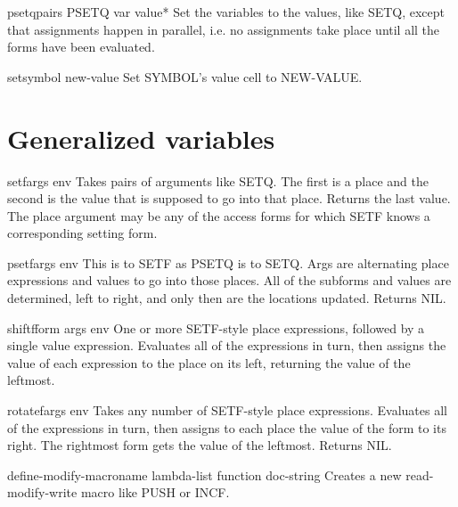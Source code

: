 \documentclass[10pt,english]{book}
\begin{document}
\begin{macro}{psetq}{\rest pairs}
  PSETQ {var value}*
   Set the variables to the values, like SETQ, except that assignments
   happen in parallel, i.e. no assignments take place until all the
   forms have been evaluated.
\end{macro}

\begin{function}{set}{symbol new-value}
  Set SYMBOL's value cell to NEW-VALUE.
\end{function}

\section{Generalized variables}
\label{sec:gener-vari}

\begin{macro}{setf}{\rest args \env env}
  Takes pairs of arguments like SETQ. The first is a place and the second
  is the value that is supposed to go into that place. Returns the last
  value. The place argument may be any of the access forms for which SETF
  knows a corresponding setting form.
\end{macro}

\begin{macro}{psetf}{\rest args \env env}
  This is to SETF as PSETQ is to SETQ. Args are alternating place
  expressions and values to go into those places. All of the subforms and
  values are determined, left to right, and only then are the locations
  updated. Returns NIL.
\end{macro}

\begin{macro}{shiftf}{\whole form \rest args \env env}
  One or more SETF-style place expressions, followed by a single
   value expression. Evaluates all of the expressions in turn, then
   assigns the value of each expression to the place on its left,
   returning the value of the leftmost.
\end{macro}

\begin{macro}{rotatef}{\rest args \env env}
  Takes any number of SETF-style place expressions. Evaluates all of the
   expressions in turn, then assigns to each place the value of the form to
   its right. The rightmost form gets the value of the leftmost.
   Returns NIL.
\end{macro}

\begin{macro}{define-modify-macro}{name lambda-list function \op doc-string}
  Creates a new read-modify-write macro like PUSH or INCF.
\end{macro}
\end{document}

